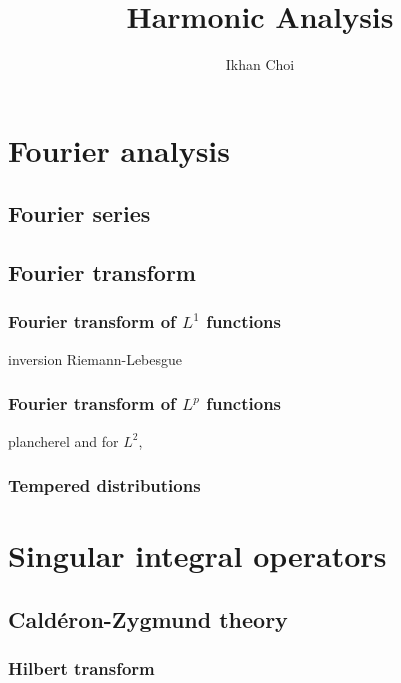 \documentclass{../note}
\begin{document}
\title{Harmonic Analysis}
\author{Ikhan Choi}
\maketitle
\tableofcontents

\part{Fourier analysis}

\chapter{Fourier series}

\chapter{Fourier transform}
\section{Fourier transform of $L^1$ functions}
inversion
Riemann-Lebesgue

\section{Fourier transform of $L^p$ functions}
plancherel and for $L^2$,

\section{Tempered distributions}


\chapter{}

\part{Singular integral operators}
\chapter{Cald\'eron-Zygmund theory}

\section{Hilbert transform}
\end{document}
